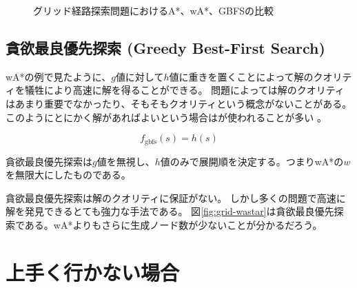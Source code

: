 \begin{figure}
  \centering
   \hspace{4pt}
   \hspace{4pt}
  \caption{グリッド経路探索問題におけるA*、wA*、GBFSの比較}
  \label{fig:grid-comparison}
\end{figure}

\subsection{貪欲最良優先探索 (Greedy Best-First Search)}
\label{sec:greedy-best-first-search}

wA*の例で見たように、$g$値に対して$h$値に重きを置くことによって解のクオリティを犠牲により高速に解を得ることができる。
問題によっては解のクオリティはあまり重要でなかったり、そもそもクオリティという概念がないことがある。
このようにとにかく解があればよいという場合はが使われることが多い \cite{wilt2010comparison}。

\begin{equation}
  f_{\text{gbfs}}(s) = h(s)
\end{equation}

貪欲最良優先探索は$g$値を無視し、$h$値のみで展開順を決定する。つまりwA*の$w$を無限大にしたものである。

貪欲最良優先探索は解のクオリティに保証がない。
しかし多くの問題で高速に解を発見できるとても強力な手法である。
図\ref{fig:grid-wastar}は貪欲最良優先探索である。wA*よりもさらに生成ノード数が少ないことが分かるだろう。



\section{上手く行かない場合}

